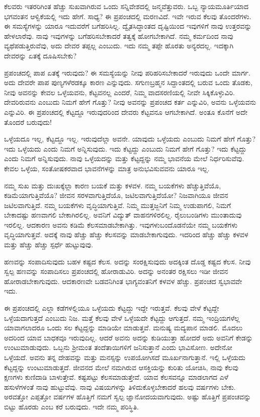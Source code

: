 \vskip 2pt

ಕೆಲವರು ಇತರರಿಗಿಂತ ಹೆಚ್ಚು ಸುಖವಾಗಿರುವ ಒಂದು ಸನ್ನಿವೇಶದಲ್ಲಿ ಜನ್ಮವೆತ್ತುವರು. ಒಬ್ಬ ನ್ಯಾಯಮೂರ್ತಿಯಾದ ಭಗವಂತನ ಆಳ್ವಿಕೆಯಲ್ಲಿ ಇದು ಹೇಗೆ. ಸಾಧ್ಯ? ಈ ಪ್ರಪಂಚದಲ್ಲಿ ಮರಣವಿದೆ. ಇವೇ ಇರುವ ಕೆಲವು ತೊಂದರೆಗಳು. ಈ ಸಮಸ್ಯೆಗಳನ್ನು ಯಾರೂ ಇದುವರೆಗೆ ಬಗೆಹರಿಸಿಲ್ಲ. ದ್ವೈತಸಿದ್ಧಾಂತದ ದೃಷ್ಟಿಯಿಂದ ಇವುಗಳಿಗೆ ನಾವು ಉತ್ತರವನ್ನು ಹೇಳಲಾರೆವು. ನಾವು ಇವುಗಳನ್ನು ಬಗೆಹರಿಸಬೇಕಾದರೆ ತತ್ವಕ್ಕೆ ಹೋಗಬೇಕಾಗಿದೆ. ನಮ್ಮ ಕರ್ಮದಿಂದ ನಾವು ವ್ಯಥೆಪಡುತ್ತಿರುವೆವು, ಅದು ದೇವರ ತಪ್ಪಲ್ಲ ಎಂಬುದು. ಇದು ನಮ್ಮ ತಪ್ಪೇ ಹೊರತು ಅನ್ಯರದಲ್ಲ. ಇದಕ್ಕಾಗಿ ದೇವರನ್ನು ಏತಕ್ಕೆ ದೂಷಿಸಬೇಕು?

\vskip 2pt

ಪ್ರಪಂಚದಲ್ಲಿ ಪಾಪ ಏತಕ್ಕೆ ಇರುವುದು? ಈ ಸಮಸ್ಯೆಯನ್ನು ನೀವು ಪರಿಹರಿಸಬೇಕಾದರೆ ಇರುವುದು ಒಂದೇ ಮಾರ್ಗ. ಅದು ದೇವರೇ ಪಾಪ ಪುಣ್ಯಗಳೆರಡಕ್ಕೂ ಕಾರಣ ಎನ್ನುವುದು. ಸಗುಣಬ್ರಹ್ಮನ ಸಿದ್ದಾಂತದಲ್ಲಿ ಬರುವ ಒಂದು ತೊಡಕು, ನೀವು ಅವನನ್ನು ಕೇವಲ ಒಳ್ಳೆಯವನು, ಕೆಟ್ಟವನಲ್ಲ ಎಂದರೆ, ನಿಮ್ಮ ವಾದಸರಣಿಯಲ್ಲಿ ನೀವೇ ಸಿಕ್ಕಿಕೊಳ್ಳುವಿರಿ. ದೇವರಿರುವನು ಎಂಬುದು ನಿಮಗೆ ಹೇಗೆ ಗೊತ್ತು? ನೀವು ಅವನನ್ನು ಪ್ರಪಂಚದ ಕರ್ತ ಎನ್ನುವಿರಿ, ಅವನು ಒಳ್ಳೆಯವನು ಎನ್ನುವಿರಿ. ಈ ಪ್ರಪಂಚದಲ್ಲಿ ಕೆಟ್ಟದ್ದೂ ಇರುವುದರಿಂದ ದೇವರು ಕೆಟ್ಟವನೂ ಆಗಬೇಕಾಗಿದೆ. ಅಂತೂ ಕೊನೆಗೆ ಅದೇ ತೊಂದರೆ ಬರುವುದು!

ಒಳ್ಳೆಯದೂ ಇಲ್ಲ, ಕೆಟ್ಟದ್ದೂ ಇಲ್ಲ. ಇರುವುದೆಲ್ಲಾ ಅವನೇ. ಯಾವುದು ಒಳ್ಳೆಯದು ಎಂಬುದು ನಿಮಗೆ ಹೇಗೆ ಗೊತ್ತು? ಇದು ಒಳ್ಳೆಯದು ಎಂದು ನಿಮಗೆ ಅನ್ನಿಸುವುದು. ಇದು ಕೆಟ್ಟದ್ದು ಎಂಬುದು ನಿಮಗೆ ಹೇಗೆ ಗೊತ್ತು? ಇದು ಕೆಟ್ಟದ್ದು ಎಂದು ನಿಮಗೆ ಅನ್ನಿಸುವುದು. ನಾವು ಒಳ್ಳೆಯದನ್ನು ಮತ್ತು ಕೆಟ್ಟದ್ದನ್ನು ನಮ್ಮ ಭಾವನೆಯ ಮೇಲೆ ನಿರ್ಧರಿಸುವೆವು. ಕೇವಲ ಒಳ್ಳೆಯ, ಸಂತೋಷಕರವಾದ ಭಾವನೆಗಳನ್ನು ಮಾತ್ರ ಅನುಭವಿಸುವವನು ಯಾರೂ ಇಲ್ಲ.

ನಮ್ಮ ಸುಖ ಮತ್ತು ದುಃಖಕ್ಕೆಲ್ಲಾ ಕಾರಣ ಬಯಕೆ ಮತ್ತು ಕಳವಳ. ನಮ್ಮ ಬಯಕೆಗಳು ಹೆಚ್ಚುತ್ತಿವೆಯೊ, ಕಡಿಮೆಯಾಗುತ್ತಿವೆಯೊ? ಜೀವನ ಸರಳವಾಗುತ್ತಿದೆಯೊ, ಜಟಿಲವಾಗುತ್ತಿದೆಯೋ? ನಿಜವಾಗಿಯೂ ಜೀವನ ಜಟಿಲವಾಗುತ್ತಿದೆ. ನಮ್ಮ ಬಯಕೆಗಳು ವೃದ್ಧಿಯಾಗುತ್ತಿವೆ. ನಿಮ್ಮ ಮುತ್ತಜ್ಜನಿಗೆ ನಿಮ್ಮ ಉಡುಪಾಗಲಿ, ನಿಮಗೆ ಬೇಕಾದಷ್ಟು ಹಣವಾಗಲಿ ಬೇಕಾಗಿರಲಿಲ್ಲ. ಅವನಿಗೆ ವಿದ್ಯುತ್ ವಾಹನಗಳಿರಲಿಲ್ಲ. ರೈಲುಬಂಡಿಗಳು ಮುಂತಾದುವು ಇರಲಿಲ್ಲ. ಆದಕಾರಣ ಅವನು ಕಡಿಮೆ ಕೆಲಸಮಾಡಬೇಕಾಗಿತ್ತು. ಇವುಗಳು\break ಬಂದೊಡನೆಯೇ ನಮ್ಮ ಬಯಕೆಗಳು ವೃದ್ಧಿಯಾಗುತ್ತವೆ. ಅದಕ್ಕೆ ನಾವು ಹೆಚ್ಚು ಹೆಚ್ಚು ಕೆಲಸವನ್ನು ಮಾಡಬೇಕಾಗುವುದು. ಇದರಿಂದ ಹೆಚ್ಚು ಹೆಚ್ಚು ಕಳವಳ ಮತ್ತು ಹೆಚ್ಚು ಹೆಚ್ಚು ಸ್ಪರ್ಧೆ ಹುಟ್ಟುವುವು.

ಹಣವನ್ನು ಸಂಪಾದಿಸುವುದು ಬಹಳ ಕಷ್ಟದ ಕೆಲಸ. ಅದನ್ನು ಸಂರಕ್ಷಿಸುವುದು ಅದಕ್ಕಿಂತ ದೊಡ್ಡ ಕಷ್ಟದ ಕೆಲಸ. ನೀವು ಸ್ವಲ್ಪ ಹಣವನ್ನು ಸಂಪಾದಿಸಲು ಪ್ರಪಂಚದಲ್ಲಿ ಹೋರಾಡುವಿರಿ. ಅದನ್ನು ಅನಂತರ ರಕ್ಷಿಸಲು ಇಡೀ ಜೀವನ ಹೋರಾಡಬೇಕಾಗುವುದು. ಆದಕಾರಣವೇ ಬಡವನಿಗಿಂತ ಭಾಗ್ಯವಂತನಿಗೆ ಕಳವಳ ಹೆಚ್ಚು. ಪ್ರಪಂಚದ ಸ್ವಭಾವವೇ ಇದು.

ಈ ಪ್ರಪಂಚದಲ್ಲಿ ಎಲ್ಲಾ ಕಡೆಗಳಲ್ಲಿಯೂ ಒಳ್ಳೆಯದು ಕೆಟ್ಟದ್ದು ಇದ್ದೇ ಇರುತ್ತವೆ. ಕೆಲವು ವೇಳೆ ಕೆಟ್ಟದ್ದೇ ಒಳ್ಳೆಯದಾಗುತ್ತದೆ ಎಂಬುದು ನಿಜ. ಮತ್ತೆ ಕೆಲವು ವೇಳೆ ಒಳ್ಳೆಯದೇ ಕೆಟ್ಟದ್ದು ಆಗುತ್ತದೆ. ನಮ್ಮ ಇಂದ್ರಿಯಗಳೆಲ್ಲ ಯಾವಾಗಲಾದರೂ ಒಂದು ಸಲ ಕೆಟ್ಟದ್ದನ್ನು ಮಾಡಿಯೇ ಮಾಡುತ್ತವೆ. ಮನುಷ್ಯ ಮದ್ಯಪಾನ ಮಾಡಲಿ. ಮೊದಲು ಅದರಿಂದ ಯಾವ ಬಾಧಕವೂ ಇರುವುದಿಲ್ಲ. ಆದರೆ ಅವನು ಅದನ್ನು ಕುಡಿಯುತ್ತಾ ಹೋದರೆ ಅದು ಅವನಿಗೆ ಕೇಡನ್ನು ಉಂಟುಮಾಡುವುದು. ಒಬ್ಬನು ಶ‍್ರೀಮಂತ ತಂದೆತಾಯಿಗಳಿಗೆ ಜನಿಸುತ್ತಾನೆ ಎಂದು ಭಾವಿಸೋಣ. ಅದೇನೋ ಒಳ್ಳೆಯದೆ. ಅವನು ತನ್ನ ದೇಹವನ್ನು ಮತ್ತು ಮನಸ್ಸನ್ನು ಉಪಯೋಗಿಸದೆ ಮೂರ್ಖನಾಗುತ್ತಾನೆ. ಇಲ್ಲಿ ಒಳ್ಳೆಯದು ಕೆಟ್ಟದ್ದನ್ನು ಉಂಟುಮಾಡುತ್ತದೆ. ಜೀವನದ ಮೇಲೆ ನಮಗಿರುವ ಆಸಕ್ತಿಯನ್ನು ಕುರಿತು ಯೋಚಿಸಿ, ನಾವು ಕೆಲವು ಕ್ಷಣಗಳು ಕುಣಿದಾಡಿ ಬಾಳುತ್ತೇವೆ. ಕಷ್ಟಪಟ್ಟು ಕೆಲಸಮಾಡುತ್ತೇವೆ. ಯಾವ ಕೆಲಸವನ್ನೂ ಮಾಡಲಾಗದ ಎಳೆ ಹಸುಳೆಗಳಂತೆ ನಾವು ಹುಟ್ಟುವೆವು. ನಾವು ವಿಷಯಗಳನ್ನು ತಿಳಿದುಕೊಳ್ಳಬೇಕಾದರೆ ಹಲವು ವರ್ಷಗಳು ಬೇಕು. ಅರವತ್ತೋ ಎಪ್ಪತ್ತೋ ವರ್ಷಗಳ ಹೊತ್ತಿಗೆ ನಮಗೆ ಸ್ವಲ್ಪ ಜ್ಞಾನೋದಯವಾಗುವುದು. ಅಷ್ಟು ಹೊತ್ತಿಗೆ ಪ್ರಪಂಚವನ್ನು ಬಿಟ್ಟು ಹೊರಡು ಎಂಬ ಕರೆ ಬರುವುದು. ಇದೇ ನಮ್ಮ ಪರಿಸ್ಥಿತಿ.


